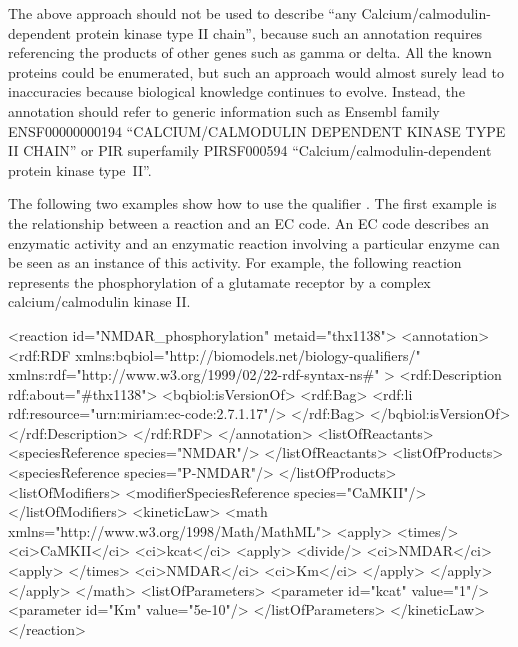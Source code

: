 The above approach should not be used to describe ``any
Calcium/calmodulin-dependent protein kinase type II chain'',
because such an annotation requires referencing the products of
other genes such as gamma or delta. All the known proteins could
be enumerated, but such an approach would almost surely lead to
inaccuracies because biological knowledge continues to evolve.
Instead, the annotation should refer to generic information such
as Ensembl family ENSF00000000194 ``CALCIUM/CALMODULIN DEPENDENT
KINASE TYPE II CHAIN'' or PIR superfamily PIRSF000594
``Calcium/calmodulin-dependent protein kinase type~II''.


The following two examples show how to use the qualifier
. The first example is the relationship
between a reaction and an EC code. An EC code describes an
enzymatic activity and an enzymatic reaction involving a
particular enzyme can be seen as an instance of this activity. For
example, the following reaction represents the phosphorylation of
a glutamate receptor by a complex calcium/calmodulin kinase II.

\begin{blockChanged}
\begin{example}
<reaction id="NMDAR_phosphorylation" metaid="thx1138">
  <annotation>
    <rdf:RDF
      xmlns:bqbiol="http://biomodels.net/biology-qualifiers/"
      xmlns:rdf="http://www.w3.org/1999/02/22-rdf-syntax-ns\#"
    >
      <rdf:Description rdf:about="#thx1138">
        <bqbiol:isVersionOf>
          <rdf:Bag>
            <rdf:li rdf:resource="urn:miriam:ec-code:2.7.1.17"/>
          </rdf:Bag>
        </bqbiol:isVersionOf>
      </rdf:Description>
    </rdf:RDF>
  </annotation>
  <listOfReactants>
    <speciesReference species="NMDAR"/>
  </listOfReactants>
  <listOfProducts>
    <speciesReference species="P-NMDAR"/>
  </listOfProducts>
  <listOfModifiers>
    <modifierSpeciesReference species="CaMKII"/>
  </listOfModifiers>
  <kineticLaw>
    <math xmlns="http://www.w3.org/1998/Math/MathML">
      <apply>
        <times/>
        <ci>CaMKII</ci>
        <ci>kcat</ci>
        <apply>
          <divide/>
          <ci>NMDAR</ci>
          <apply>
            </times>
            <ci>NMDAR</ci>
            <ci>Km</ci>
          </apply>
        </apply>
      </apply>
    </math>
    <listOfParameters>
      <parameter id="kcat" value="1"/>
      <parameter id="Km" value="5e-10"/>
    </listOfParameters>
  </kineticLaw>
</reaction>
\end{example}
\end{blockChanged}

